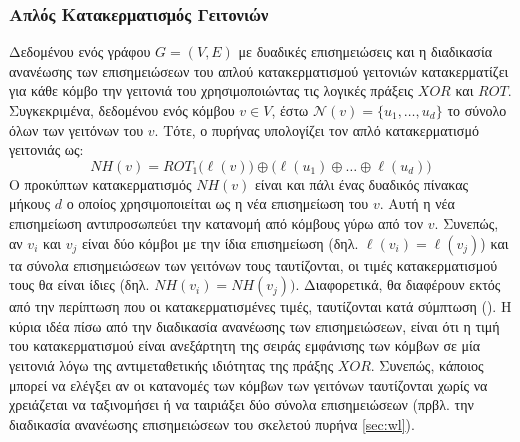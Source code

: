 \subsubsection{Απλός Κατακερματισμός Γειτονιών}
Δεδομένου ενός γράφου $G=(V,E)$ με δυαδικές επισημειώσεις και η διαδικασία ανανέωσης των επισημειώσεων του απλού κατακερματισμού γειτονιών κατακερματίζει για κάθε κόμβο την γειτονιά του χρησιμοποιώντας τις λογικές πράξεις $XOR$ και $ROT$.
Συγκεκριμένα, δεδομένου ενός κόμβου $v \in V$, έστω $\mathcal{N}(v)=\{ u_1,\ldots,u_d \}$ το σύνολο όλων των γειτόνων του $v$.
Τότε, ο πυρήνας υπολογίζει τον απλό κατακερματισμό γειτονιάς ως:
\begin{equation}
    NH(v) = ROT_1 \big( \ell(v) \big) \oplus \big( \ell(u_1) \oplus \ldots \oplus \ell(u_d) \big)
\end{equation}
Ο προκύπτων κατακερματισμός $NH(v)$ είναι και πάλι ένας δυαδικός πίνακας μήκους $d$ ο οποίος χρησιμοποιείται ως η νέα επισημείωση του $v$.
Αυτή η νέα επισημείωση αντιπροσωπεύει την κατανομή από κόμβους γύρω από τον $v$.
Συνεπώς, αν $v_i$ και $v_j$ είναι δύο κόμβοι με την ίδια επισημείωση (δηλ. $\ell(v_i) = \ell(v_j)$) και τα σύνολα επισημειώσεων των γειτόνων τους ταυτίζονται, οι τιμές κατακερματισμού τους θα είναι ίδιες (δηλ. $NH(v_i) = NH(v_j))$.
Διαφορετικά, θα διαφέρουν εκτός από την περίπτωση που οι κατακερματισμένες τιμές, ταυτίζονται κατά σύμπτωση ().
Η κύρια ιδέα πίσω από την διαδικασία ανανέωσης των επισημειώσεων, είναι ότι η τιμή του κατακερματισμού είναι ανεξάρτητη της σειράς εμφάνισης των κόμβων σε μία γειτονιά λόγω της αντιμεταθετικής ιδιότητας της πράξης $XOR$.
Συνεπώς, κάποιος μπορεί να ελέγξει αν οι κατανομές των κόμβων των γειτόνων ταυτίζονται χωρίς να χρειάζεται να ταξινομήσει ή να ταιριάξει δύο σύνολα επισημειώσεων (πρβλ. την διαδικασία ανανέωσης επισημειώσεων του σκελετού πυρήνα  \ref{sec:wl}).

